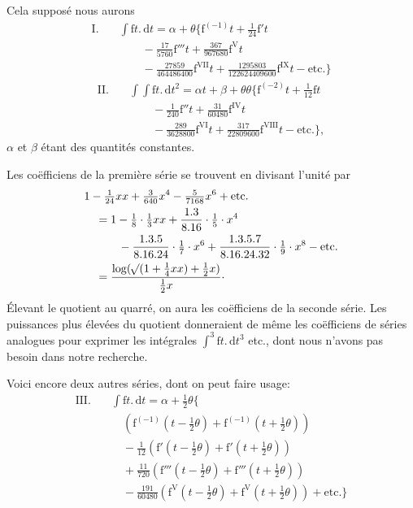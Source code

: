 \par Cela supposé nous aurons
\[
\begin{aligned}
\mathrm{I.}\quad&\int\mathrm{f}t.\,\mathrm{d}t=\alpha+\theta\bigl\{\mathrm{f}^{(-1)}t+\tfrac1{24}\mathrm{f}'t\\
&\qquad-\tfrac{17}{5760}\mathrm{f}'''t+\tfrac{367}{967680}\mathrm{f}^{\mathrm{V}}t\\
&\qquad-\tfrac{27859}{464486400}\mathrm{f}^{\mathrm{VII}}t+\tfrac{1295803}{122624409600}\mathrm{f}^{\mathrm{IX}}t-\text{etc.}\bigr\}
\end{aligned}
\]
\[
\begin{aligned}
\mathrm{II.}\quad&\int\!\int\mathrm{f}t.\,\mathrm{d}t^2=\alpha t+\beta+\theta\theta\bigl\{\mathrm{f}^{(-2)}t+\tfrac1{12}\mathrm{f}t\\
&\qquad-\tfrac1{240}\mathrm{f}''t+\tfrac{31}{60480}\mathrm{f}^{\mathrm{IV}}t\\
&\qquad-\tfrac{289}{3628800}\mathrm{f}^{\mathrm{VI}}t+\tfrac{317}{22809600}\mathrm{f}^{\mathrm{VIII}}t-\text{etc.}\bigr\},
\end{aligned}
\]
\(\alpha\) et \(\beta\) étant des quantités constantes.
\par Les coëfficiens de la première série se trouvent en divisant l’unité par
\[
\begin{aligned}
&1-\tfrac1{24}xx+\tfrac3{640}x^4-\tfrac5{7168}x^6+\text{etc.}\\
&\quad=1-\tfrac18\cdot\tfrac13xx+\dfrac{1.3}{8.16}\cdot\tfrac15\cdot x^4\\
&\qquad\quad-\dfrac{1.3.5}{8.16.24}\cdot\tfrac17\cdot x^6+\dfrac{1.3.5.7}{8.16.24.32}\cdot\tfrac19\cdot x^8-\text{etc.}\\
&\quad=\dfrac{\log(\mathord{{}^{}\!\surd}(1+\tfrac14xx)+\tfrac12x)}{\tfrac12x}\mathpunct{\cdot}
\end{aligned}
\]
Élevant le quotient au quarré, on aura les coëfficiens de la seconde série. Les puissances plus élevées du quotient donneraient de même les coëfficiens de séries analogues pour exprimer les intégrales \(\int^3\mathrm{f}t.\,\mathrm{d}t^3\) etc., dont nous n’avons pas besoin dans notre recherche.
\par Voici encore deux autres séries, dont on peut faire usage:
\[
\begin{aligned}
\mathrm{III.}\quad&\int\mathrm{f}t.\,\mathrm{d}t=\alpha+\tfrac12\theta\bigl\{\\
&\quad(\mathrm{f}^{(-1)}(t-\tfrac12\theta)+\mathrm{f}^{(-1)}(t+\tfrac12\theta))\\
&\quad-\tfrac1{12}(\mathrm{f}'(t-\tfrac12\theta)+\mathrm{f}'(t+\tfrac12\theta))\\
&\quad+\tfrac{11}{720}(\mathrm{f}'''(t-\tfrac12\theta)+\mathrm{f}'''(t+\tfrac12\theta))\\
&\quad-\tfrac{191}{60480}(\mathrm{f}^{\mathrm{V}}(t-\tfrac12\theta)+\mathrm{f}^{\mathrm{V}}(t+\tfrac12\theta))+\text{etc.}\bigr\}
\end{aligned}
\]
